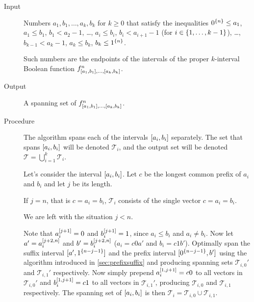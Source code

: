 \begin{description}
\item[Input] Numbers $a_1, b_1, \ldots, a_k, b_k$
for $k \geq 0$
that satisfy the inequalities
$0^{\{n\}} \leq a_1$,
$a_1 \leq b_1$,
$b_1 < a_2 - 1$,
\ldots,
$a_i \leq b_i$,
$b_i < a_{i+1} - 1$
(for $i \in \{1, \ldots, k-1\}$),
\ldots,
$b_{k-1} < a_k - 1$,
$a_k \leq b_k$,
$b_k \leq 1^{\{n\}}$.

Such numbers are the endpoints of the intervals
of the proper $k$-interval Boolean function $f^{n}_{[a_1, b_1], \ldots, [a_{k}, b_{k}]}$.

\item[Output] A spanning set of $f^{n}_{[a_1, b_1], \ldots, [a_{k}, b_{k}]}$.

\item[Procedure]
The algorithm spans each of
the intervals $[a_i, b_i]$ separately.
The set that spans $[a_i, b_i]$ will be denoted
$\mathcal{T}_i$,
and the output set will be denoted
$\mathcal{T} = \bigcup_{i=1}^k{\mathcal{T}_i}$.

Let's consider the interval $[a_i, b_i]$.
Let $c$ be the longest common prefix of $a_i$ and $b_i$
and let $j$ be its length.

If $j = n$, that is $c = a_i = b_i$,
$\mathcal{T}_i$ consists of the single vector
$c = a_i = b_i$.

We are left with the situation $j < n$.

Note that $a_i^{[j+1]} = 0$ and $b_i^{[j+1]} = 1$,
since $a_i \leq b_i$ and $a_i \neq b_i$.
Now let $a' = a_i^{[j+2, n]}$
and $b' = b_i^{[j+2, n]}$
($a_i = c 0 a'$ and $b_i = c 1 b'$).
Optimally span the suffix interval
$[a', 1^{\{n-j-1\}}]$
and the prefix interval
$[0^{\{n-j-1\}}, b']$
using the
algorithm
introduced in \cref{sec:prefixsuffix}
and producing spanning sets
$\mathcal{T}_{i, 0}'$
and $\mathcal{T}_{i, 1}'$ respectively.
Now simply prepend $a_i^{[1, j+1]} = c 0$
to all vectors in $\mathcal{T}_{i, 0}'$
and $b_i^{[1, j+1]} = c 1$
to all vectors in $\mathcal{T}_{i, 1}'$,
producing $\mathcal{T}_{i, 0}$
and $\mathcal{T}_{i, 1}$ respectively.
The spanning set of $[a_i, b_i]$
is then
$\mathcal{T}_i
= \mathcal{T}_{i, 0} \cup \mathcal{T}_{i, 1}$.
\end{description}


